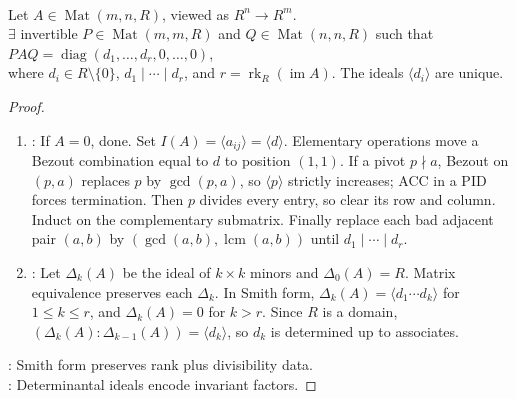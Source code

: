 \begin{theorem} \label{thm:smith-normal-form-over-pid} \\
Let $A\in\operatorname{Mat}(m,n,R)$, viewed as $R^n\to R^m$.\\
$\exists$ invertible $P\in\operatorname{Mat}(m,m,R)$ and $Q\in\operatorname{Mat}(n,n,R)$ such that $PAQ=\operatorname{diag}(d_1,\ldots,d_r,0,\ldots,0)$,\\
where $d_i\in R\setminus\{0\}$, $d_1\mid\cdots\mid d_r$, and $r=\operatorname{rk}_R(\operatorname{im}A)$. The ideals $\langle d_i\rangle$ are unique.
\begin{proof}
\begin{enumerate}[label=(\roman*)]
\setlength{\itemsep}{0pt}
\item {}: If $A=0$, done. Set $I(A)=\langle a_{ij}\rangle=\langle d\rangle$. Elementary operations move a Bezout combination equal to $d$ to position $(1,1)$. If a pivot $p\nmid a$, Bezout on $(p,a)$ replaces $p$ by $\gcd(p,a)$, so $\langle p\rangle$ strictly increases; ACC in a PID forces termination. Then $p$ divides every entry, so clear its row and column.\\
Induct on the complementary submatrix. Finally replace each bad adjacent pair $(a,b)$ by $(\gcd(a,b),\operatorname{lcm}(a,b))$ until $d_1\mid\cdots\mid d_r$.
\item {}: Let $\Delta_k(A)$ be the ideal of $k\times k$ minors and $\Delta_0(A)=R$. Matrix equivalence preserves each $\Delta_k$. In Smith form, $\Delta_k(A)=\langle d_1\cdots d_k\rangle$ for $1\leq k\leq r$, and $\Delta_k(A)=0$ for $k>r$. Since $R$ is a domain, $(\Delta_k(A):\Delta_{k-1}(A))=\langle d_k\rangle$, so $d_k$ is determined up to associates.
\end{enumerate}
\noindent
{}: Smith form preserves rank plus divisibility data.\\
: Determinantal ideals encode invariant factors.
\end{proof}
\end{theorem}


